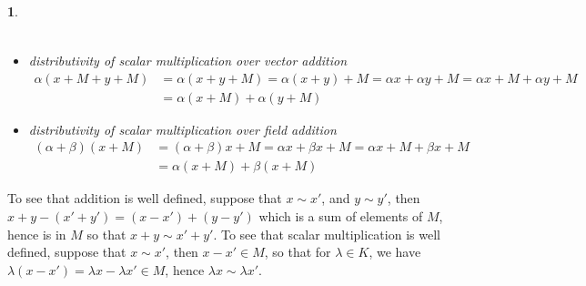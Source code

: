 \documentclass[10.5pt]{article}
\theoremstyle{definition}
\newtheorem{pb}{}
\begin{document}
\begin{pb}
\begin{itemize}
\begin{align*}
                \end{align*}
                \item \emph{distributivity of scalar multiplication over vector addition}
                \begin{align*}
                    \alpha(x + M + y + M) &= \alpha(x + y + M) = \alpha (x + y) + M = \alpha x + \alpha y + M = \alpha x + M + \alpha y + M \\
                    &= \alpha(x + M) + \alpha(y + M)
                \end{align*}
                \item \emph{distributivity of scalar multiplication over field addition}
                \begin{align*}
                    (\alpha + \beta)(x + M) &= (\alpha + \beta)x + M = \alpha x + \beta x + M = \alpha x + M + \beta x + M \\
                    &= \alpha(x + M) + \beta(x + M)
                \end{align*}
            \end{itemize}
            
            To see that addition is well defined, suppose that \(x \sim x'\), and \(y \sim y'\), then \(x + y - (x' + y') = (x - x') + (y-y')\) which is a sum of elements of \(M\), hence is in \(M\) so that \(x + y \sim x' + y'\). To see that scalar multiplication is well defined, suppose that \(x \sim x'\), then \(x - x' \in M\), so that for \(\lambda \in K\), we have \(\lambda(x - x') = \lambda x - \lambda x' \in M\), hence \(\lambda x \sim \lambda x'\).


\end{pb}
\end{document}

